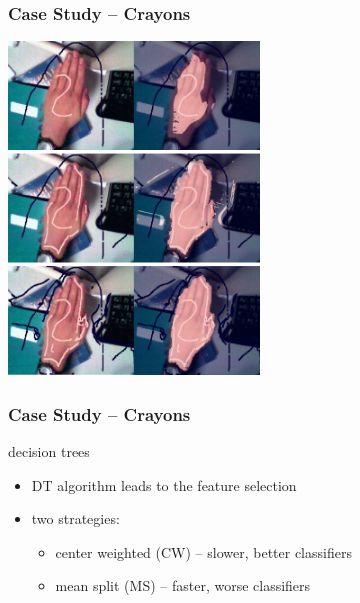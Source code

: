 \documentclass[xcolor=svgnames]{beamer}
\begin{document}
\begin{frame}
	\frametitle{Case Study -- Crayons}
	\begin{center}
		\includegraphics[width=0.5\textwidth]{2013-IA080-interactive-machine-learning/crayons-example.png}
	\end{center}
\end{frame}
\begin{frame}
	\frametitle{Case Study -- Crayons}
	\begin{center}
		{\Large decision trees}
	\end{center}

	\begin{itemize}
		\item DT algorithm leads to the feature selection
		\item two strategies:
			\begin{itemize}
				\item center weighted (CW) -- slower, better classifiers
				\item mean split (MS) -- faster, worse classifiers
			\end{itemize}
	\end{itemize}
\end{frame}
\end{document}
